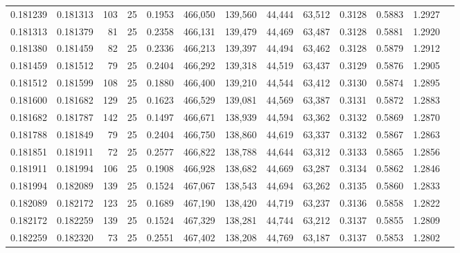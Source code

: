 \begin{tabular}{rrrrrrrrrrrrr}
0.181239 & 0.181313 &   103 &  25 &                                     0.1953 & 466,050 & 139,560 &  44,444 &  63,512 & 0.3128 & 0.5883 & 1.2927 \\
0.181313 & 0.181379 &    81 &  25 &                                     0.2358 & 466,131 & 139,479 &  44,469 &  63,487 & 0.3128 & 0.5881 & 1.2920 \\
0.181380 & 0.181459 &    82 &  25 &                                     0.2336 & 466,213 & 139,397 &  44,494 &  63,462 & 0.3128 & 0.5879 & 1.2912 \\
0.181459 & 0.181512 &    79 &  25 &                                     0.2404 & 466,292 & 139,318 &  44,519 &  63,437 & 0.3129 & 0.5876 & 1.2905 \\
0.181512 & 0.181599 &   108 &  25 &                                     0.1880 & 466,400 & 139,210 &  44,544 &  63,412 & 0.3130 & 0.5874 & 1.2895 \\
0.181600 & 0.181682 &   129 &  25 &                                     0.1623 & 466,529 & 139,081 &  44,569 &  63,387 & 0.3131 & 0.5872 & 1.2883 \\
0.181682 & 0.181787 &   142 &  25 &                                     0.1497 & 466,671 & 138,939 &  44,594 &  63,362 & 0.3132 & 0.5869 & 1.2870 \\
0.181788 & 0.181849 &    79 &  25 &                                     0.2404 & 466,750 & 138,860 &  44,619 &  63,337 & 0.3132 & 0.5867 & 1.2863 \\
0.181851 & 0.181911 &    72 &  25 &                                     0.2577 & 466,822 & 138,788 &  44,644 &  63,312 & 0.3133 & 0.5865 & 1.2856 \\
0.181911 & 0.181994 &   106 &  25 &                                     0.1908 & 466,928 & 138,682 &  44,669 &  63,287 & 0.3134 & 0.5862 & 1.2846 \\
0.181994 & 0.182089 &   139 &  25 &                                     0.1524 & 467,067 & 138,543 &  44,694 &  63,262 & 0.3135 & 0.5860 & 1.2833 \\
0.182089 & 0.182172 &   123 &  25 &                                     0.1689 & 467,190 & 138,420 &  44,719 &  63,237 & 0.3136 & 0.5858 & 1.2822 \\
0.182172 & 0.182259 &   139 &  25 &                                     0.1524 & 467,329 & 138,281 &  44,744 &  63,212 & 0.3137 & 0.5855 & 1.2809 \\
0.182259 & 0.182320 &    73 &  25 &                                     0.2551 & 467,402 & 138,208 &  44,769 &  63,187 & 0.3137 & 0.5853 & 1.2802 \\

\end{tabular}

